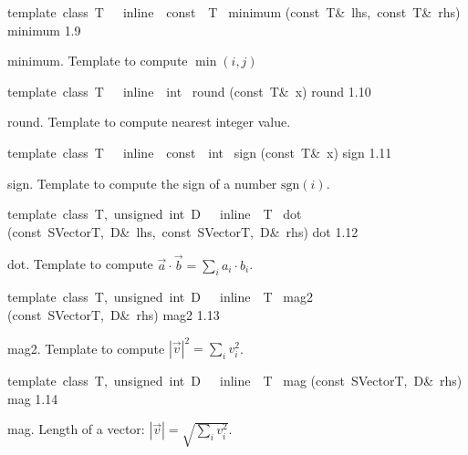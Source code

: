 \documentclass{article}
\begin{document}
\begin{cxxentry}
\begin{cxxfunction}
\begin{cxxdoc}
\end{cxxdoc}
\end{cxxfunction}
\begin{cxxfunction}
{template\ \<class\ T\>\ \ \ inline\ \ const\ \ T\ }
        {minimum}
        {(const\ T\&\ lhs,\ const\ T\&\ rhs)}
        {minimum}
        {1.9}
\begin{cxxdoc}
minimum.
Template to compute $\min(i,j)$


\end{cxxdoc}
\end{cxxfunction}
\begin{cxxfunction}
{template\ \<class\ T\>\ \ \ inline\ \ int\ }
        {round}
        {(const\ T\&\ x)}
        {round}
        {1.10}
\begin{cxxdoc}
round.
Template to compute nearest integer value.


\end{cxxdoc}
\end{cxxfunction}
\begin{cxxfunction}
{template\ \<class\ T\>\ \ \ inline\ \ const\ \ int\ }
        {sign}
        {(const\ T\&\ x)}
        {sign}
        {1.11}
\begin{cxxdoc}
sign.
Template to compute the sign of a number $\textrm{sgn}(i)$.


\end{cxxdoc}
\end{cxxfunction}
\begin{cxxfunction}
{template\ \<class\ T,\ unsigned\ int\ D\>\ \ \ inline\ \ T\ }
        {dot}
        {(const\ SVector\<T,\ D\>\&\ lhs,\ const\ SVector\<T,\ D\>\&\ rhs)}
        {dot}
        {1.12}
\begin{cxxdoc}
dot.
Template to compute $\vec{a}\cdot\vec{b} = \sum_i a_i\cdot b_i$.


\end{cxxdoc}
\end{cxxfunction}
\begin{cxxfunction}
{template\ \<class\ T,\ unsigned\ int\ D\>\ \ \ inline\ \ T\ }
        {mag2}
        {(const\ SVector\<T,\ D\>\&\ rhs)}
        {mag2}
        {1.13}
\begin{cxxdoc}
mag2.
Template to compute $|\vec{v}|^2 = \sum_iv_i^2$.


\end{cxxdoc}
\end{cxxfunction}
\begin{cxxfunction}
{template\ \<class\ T,\ unsigned\ int\ D\>\ \ \ inline\ \ T\ }
        {mag}
        {(const\ SVector\<T,\ D\>\&\ rhs)}
        {mag}
        {1.14}
\begin{cxxdoc}
mag.
Length of a vector: $|\vec{v}| = \sqrt{\sum_iv_i^2}$.



\end{cxxdoc}
\end{cxxfunction}
\end{cxxentry}
\end{document}
